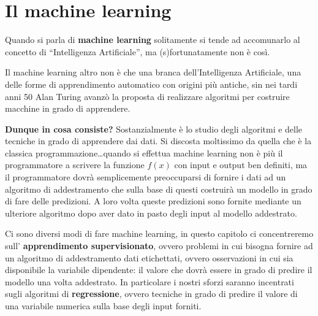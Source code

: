 \documentclass[a4paper, 11pt, oneside]{report}
\begin{document}
    \chapter{Il machine learning}
        Quando si parla di \textbf{machine learning} solitamente si tende ad accomunarlo al concetto di ``Intelligenza Artificiale'',
        ma (s)fortunatamente non è così.
        \par \noindent Il machine learning altro non è che una branca dell'Intelligenza Artificiale, una delle forme
        di apprendimento automatico con origini più antiche, sin nei tardi anni 50 Alan Turing avanzò la proposta
        di realizzare algoritmi per costruire macchine in grado di apprendere.
        \par \noindent \textbf{Dunque in cosa consiste?} Sostanzialmente è lo studio degli algoritmi e delle tecniche in
        grado di apprendere dai dati.
        Si discosta moltissimo da quella che è la classica programmazione\ldots quando si effettua machine learning non
        è più il programmatore a scrivere la funzione $f(x)$ con input e output ben definiti, ma il
        programmatore dovrà semplicemente preoccuparsi di fornire i dati ad un algoritmo di addestramento che sulla base
        di questi costruirà un modello in grado di fare delle predizioni. A loro volta queste predizioni sono fornite
        mediante un ulteriore algoritmo dopo aver dato in pasto degli input al modello addestrato.
        \\
        \par \noindent Ci sono diversi modi di fare machine learning, in questo capitolo ci concentreremo sull'
        \textbf{apprendimento supervisionato}, ovvero problemi in cui bisogna fornire ad un algoritmo di addestramento
        dati etichettati, ovvero osservazioni in cui sia disponibile la variabile dipendente: il valore che
        dovrà essere in grado di predire il modello una volta addestrato.
        In particolare i nostri sforzi saranno incentrati sugli algoritmi di \textbf{regressione}, ovvero tecniche in grado
        di predire il valore di una variabile numerica sulla base degli input forniti.

            \bigskip
\end{document}
